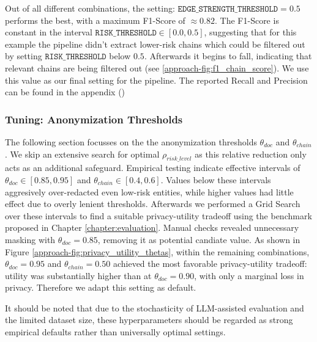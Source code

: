 Out of all different combinations, the setting: $\texttt{EDGE\_STRENGTH\_THRESHOLD} = 0.5$ performs the best, with a maximum F1-Score of $\approx 0.82$. The F1-Score is constant in the interval $\texttt{RISK\_THRESHOLD} \in [0.0,0.5]$, suggesting that for this example the pipeline didn't extract lower-risk chains which could be filtered out by setting $\texttt{RISK\_THRESHOLD}$ below $0.5$. Afterwards it begins to fall, indicating that relevant chains are being filtered out (see \ref{approach-fig:f1_chain_score}). We use this value as our final setting for the pipeline. The reported Recall and Precision can be found in the appendix () %

\subsubsection{Tuning: Anonymization Thresholds}
The following section focusses on the the anonymization thresholds $\theta_{doc}$ and $\theta_{chain}$. We skip an extensive search for optimal $\rho_{risk\_level}$ as this relative reduction only acts as an additional safeguard.
Empirical testing indicate effective intervals of $\theta_{doc}\in[0.85,0.95]$ and $\theta_{chain}\in[0.4,0.6]$. Values below these intervals aggresively over-redacted even low-risk entities, while higher values had little effect due to overly lenient thresholds. Afterwards we performed a Grid Search over these intervals to find a suitable privacy-utility tradeoff using the benchmark proposed in Chapter \ref{chapter:evaluation}. Manual checks revealed unnecessary masking with $\theta_{doc}=0.85$, removing it as potential candiate value. As shown in Figure \ref{approach-fig:privacy_utility_thetas}, within the remaining combinations, $\theta_{doc}=0.95$ and $\theta_{chain}=0.50$ achieved the most favorable privacy-utility tradeoff: utility was substantially higher than at $\theta_{doc}=0.90$, with only a marginal loss in privacy. Therefore we adapt this setting as default.  
 
It should be noted that due to the stochasticity of LLM-assisted evaluation and the limited dataset size, these hyperparameters should be regarded as strong empirical defaults rather than universally optimal settings.
 
